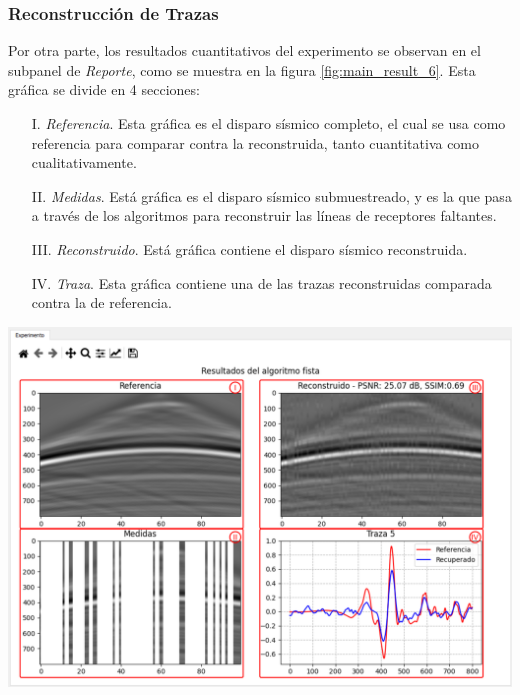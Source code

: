 \documentclass[12pt,twoside,letter]{ol-softwaremanual}
\newenvironment{Figure}
  {\par\medskip\noindent\minipage{\linewidth}}
  {\endminipage\par\medskip}
\begin{document}
\subsubsection*{Reconstrucción de Trazas}

Por otra parte, los resultados cuantitativos del experimento se observan en el subpanel de \emph{Reporte}, como se muestra en la figura \ref{fig:main_result_6}. Esta gráfica se divide en 4 secciones:

\begin{itemize}[leftmargin=0.5in]
	\setlength\itemsep{0em}
    \item[I.]  \textit{Referencia}. Esta gráfica es el disparo sísmico completo, el cual se usa como referencia para comparar contra la reconstruida, tanto cuantitativa como cualitativamente.
    
    \item[II.] \textit{Medidas}. Está gráfica es el disparo sísmico submuestreado, y es la que pasa a través de los algoritmos para reconstruir las líneas de receptores faltantes.
    
    \item[III.] \textit{Reconstruido}. Está gráfica contiene el disparo sísmico reconstruida.
    
    \item[IV.] \textit{Traza}. Esta gráfica contiene una de las trazas reconstruidas comparada contra la de referencia.
    
\end{itemize}

\begin{Figure}
    \centering
    \includegraphics[width=1\linewidth]{main-result-6.png}
    \label{fig:main_result_6}
\end{Figure}
\end{document}
